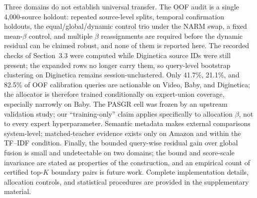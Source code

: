 \documentclass[runningheads]{llncs}
\begin{document}
Three domains do not establish universal transfer. The OOF audit is a
single 4,000-source holdout: repeated source-level splits, temporal
confirmation holdouts, the equal/global/dynamic control trio under the NARM
swap, a fixed mean-$\beta$ control, and multiple $\beta$ reassignments are
required before the dynamic residual can be claimed robust, and none of them
is reported here. The recorded checks of Section~3.3 were computed while
Diginetica source IDs were still present; the expanded rows no longer carry
them, so query-level bootstrap clustering on Diginetica remains
session-unclustered.
Only 41.7\%, 21.1\%, and 82.5\% of OOF calibration queries are actionable on
Video, Baby, and Diginetica; the allocator is therefore trained conditionally
on expert-union coverage, especially narrowly on Baby.
The PASGR cell was frozen by an upstream validation study;
our ``training-only'' claim applies specifically to allocation $\beta$, not
to every expert hyperparameter. Semantic metadata makes external comparisons
system-level; matched-teacher evidence exists only on Amazon and within the
TF--IDF condition. Finally, the
bounded query-wise residual gain over global fusion is small and undetectable
on two domains; the bound and score-scale invariance are stated as properties
of the construction, and an empirical count of certified top-$K$ boundary
pairs is future work. Complete implementation details, allocation controls,
and statistical procedures are provided in the supplementary material.



\end{document}

